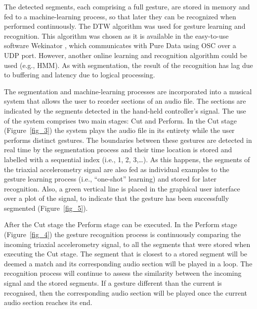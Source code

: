 \documentclass{nime-alternate_MANUSCRIPT} %
\begin{document}
The detected segments, each comprising a full gesture, are stored in memory and fed to a machine-learning process, so that later they can be recognized when performed continuously. The DTW algorithm was used for gesture learning and recognition. This algorithm was chosen as it is available in the easy-to-use software Wekinator \cite{Fiebrink_etal_2009, Wekinator_website}, which communicates with Pure Data using OSC over a UDP port. However, another online learning and recognition algorithm could be used (e.g., HMM). As with segmentation, the result of the recognition has lag due to buffering and latency due to logical processing.

The segmentation and machine-learning processes are incorporated into a musical system that allows the user to reorder sections of an audio file. The sections are indicated by the segments detected in the hand-held controller’s signal. The use of the system comprises two main stages: Cut and Perform. In the Cut stage (Figure~\ref{fig_3}) the system plays the audio file in its entirety while the user performs distinct gestures. The boundaries between these gestures are detected in real time by the segmentation process and their time location is stored and labelled with a sequential index (i.e., 1, 2, 3,…). As this happens, the segments of the triaxial accelerometry signal are also fed as individual examples to the gesture learning process (i.e., “one-shot” learning) and stored for later recognition. Also, a green vertical line is placed in the graphical user interface over a plot of the signal, to indicate that the gesture has been successfully segmented (Figure~\ref{fig_5}).

After the Cut stage the Perform stage can be executed. In the Perform stage (Figure~\ref{fig_4}) the gesture recognition process is continuously comparing the incoming triaxial accelerometry signal, to all the segments that were stored when executing the Cut stage. The segment that is closest to a stored segment will be deemed a match and its corresponding audio section will be played in a loop. The recognition process will continue to assess the similarity between the incoming signal and the stored segments. If a gesture different than the current is recognised, then the corresponding audio section will be played once the current audio section reaches its end. 
\end{document}
